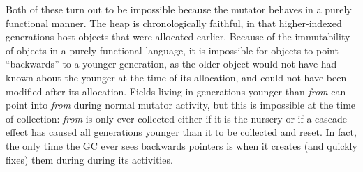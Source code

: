 \documentclass[acmsmall,review,anonymous]{acmart}\settopmatter{printfolios=true,printccs=false,printacmref=false}
\begin{document}
Both of these turn out to be impossible because the 
mutator behaves in a purely functional manner.
The heap is chronologically
faithful, in that higher-indexed generations host
objects that were allocated earlier. Because
of the immutability of objects in a purely functional language, 
it is impossible for objects to point ``backwards'' to 
a younger generation, as the older object would not have
had known about the younger at the time of its allocation, and could not 
have been modified after its allocation. Fields living in generations 
younger than \emph{from} can point into \emph{from} during 
normal mutator activity, but this is
impossible at the time of collection: 
\emph{from} is only ever collected either if it is
the nursery or if a cascade effect has caused all generations younger
than it to be collected and reset. 
In fact, the only time the GC ever sees backwards pointers
is when it creates (and quickly fixes) them during during its 
activities.
\end{document}
